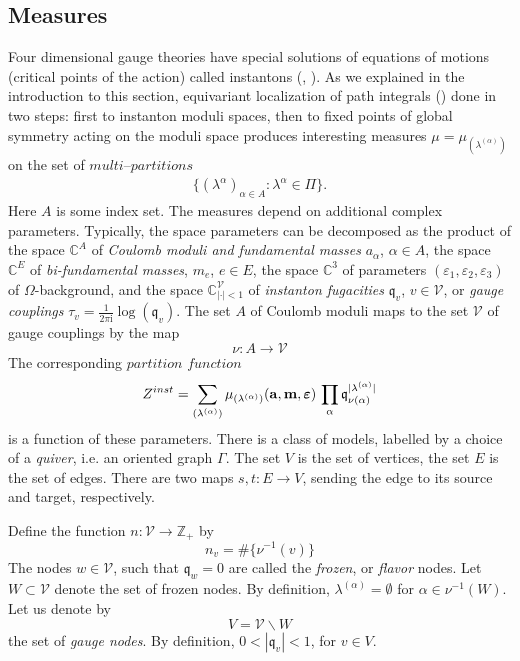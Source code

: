 \documentclass[12pt]{article}
\numberwithin{equation}{section}
\newcommand{\ve}{{\varepsilon}}
\newcommand{\bve}{\boldsymbol{\varepsilon}}
\newcommand\beq{\begin{equation}}
\newcommand\eeq{\end{equation}}
\theoremstyle{definition}
\newcommand {\BC}   {\mathbb C}
\newcommand {\qe} {\mathfrak q}
\newcommand {\BZ}   {\mathbb Z}
\newcommand {\CalV} {\mathcal V}
\newcommand {\ii} {\mathrm{i}}
\begin{document}
\subsection{Measures}
Four dimensional gauge theories have special solutions of equations of motions (critical points of the action)  called instantons (\cite{Nekrasov:2005wp}, \cite{FRENKEL2007215}). 
As we explained in the introduction to this section, equivariant
localization of path integrals (\cite{Nekrasov:2002qd}) done in two steps: first to instanton moduli spaces, then to fixed points of global symmetry acting on the moduli space produces  interesting measures $\mu = \mu_{(\lambda^{(\alpha)})}$ on the set of $\textit{multi--partitions}$
\begin{align*}
    \{(\lambda^{\alpha})_{\alpha \in A}: \lambda^{\alpha} \in \Pi \}.
\end{align*}
Here $A$ is some index set. The measures depend on additional complex parameters. 
Typically, the space parameters can be decomposed as the product of the space ${\BC}^{A}$ of \emph{Coulomb moduli and fundamental masses} $a_{\alpha}$, ${\alpha} \in A$,  the space ${\BC}^{E}$ of \emph{bi-fundamental masses}, $m_{e}$, $e \in E$, the space ${\BC}^{3}$ of parameters 
$({\ve}_{1}, {\ve}_{2}, {\ve}_{3})$ of $\Omega$-background, and the space ${\BC}^{\CalV}_{|{\cdot}|<1}$ of \emph{instanton fugacities} ${\qe}_{v}$, $v \in {\CalV}$, or \emph{gauge couplings}
${\tau}_{v} = \frac{1}{2\pi\ii} {\log}({\qe}_{v})$. The set $A$ of Coulomb moduli maps to the set $\CalV$ of gauge couplings by the map 
\beq
{\nu} : A \to {\CalV}
\eeq
The corresponding $\textit{partition function}$
\begin{align*}
    Z^{inst} = \sum\limits_{(\lambda^{(\alpha)})} \mu_{(\lambda^{(\alpha)})} ( {\bf a}, {\bf m},  {\bve} ) \, \prod_{\alpha} {\qe}_{{\nu}({\alpha})}^{|{\lambda}^{({\alpha})}|}
\end{align*}
is a function of these parameters. 
There is a class of models, labelled by a choice of a \emph{quiver}, i.e. an oriented graph 
$\Gamma$. The set $V$ is the set of vertices, the set $E$ is the set of edges. There are two maps
$s,t: E \to V$, sending the edge to its source and target, respectively. 

Define the function $n: {\CalV} \to {\BZ}_{+}$  by
\beq
n_{v} = \# \{ {\nu}^{-1}(v) \} 
\eeq
The nodes $w \in {\CalV}$, such that ${\qe}_{w} = 0$ are called the \emph{frozen}, or \emph{flavor} nodes. Let $W \subset {\CalV}$ denote the set of frozen nodes. By definition, ${\lambda}^{({\alpha})} = {\emptyset}$ for $\alpha \in {\nu}^{-1}(W)$. 
Let us denote by
\beq
V = {\CalV} \backslash W
\eeq
the set of \emph{gauge nodes}. By definition, $0 < |{\qe}_{v}| < 1$, for $v \in V$. 
\end{document}

